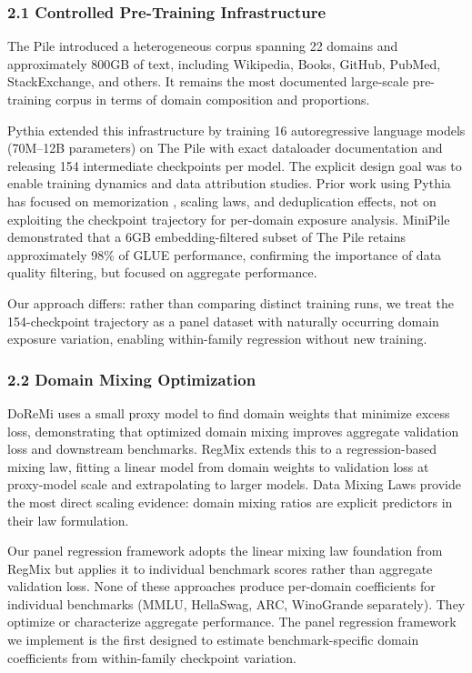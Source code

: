 
\subsubsection{2.1 Controlled Pre-Training Infrastructure}

The Pile \citep{Gao2020} introduced a heterogeneous corpus spanning 22 domains and approximately 800GB of text, including Wikipedia, Books, GitHub, PubMed, StackExchange, and others. It remains the most documented large-scale pre-training corpus in terms of domain composition and proportions.

Pythia \citep{Biderman2023} extended this infrastructure by training 16 autoregressive language models (70M--12B parameters) on The Pile with exact dataloader documentation and releasing 154 intermediate checkpoints per model. The explicit design goal was to enable training dynamics and data attribution studies. Prior work using Pythia has focused on memorization \citep{Biderman2023}, scaling laws, and deduplication effects, not on exploiting the checkpoint trajectory for per-domain exposure analysis. MiniPile \citep{Kaddour2023MiniPile} demonstrated that a 6GB embedding-filtered subset of The Pile retains approximately 98\% of GLUE performance, confirming the importance of data quality filtering, but focused on aggregate performance.

Our approach differs: rather than comparing distinct training runs, we treat the 154-checkpoint trajectory as a panel dataset with naturally occurring domain exposure variation, enabling within-family regression without new training.

\subsubsection{2.2 Domain Mixing Optimization}

DoReMi \citep{Xie2023} uses a small proxy model to find domain weights that minimize excess loss, demonstrating that optimized domain mixing improves aggregate validation loss and downstream benchmarks. RegMix \citep{Liu2024} extends this to a regression-based mixing law, fitting a linear model from domain weights to validation loss at proxy-model scale and extrapolating to larger models. Data Mixing Laws \citep{Ye2024} provide the most direct scaling evidence: domain mixing ratios are explicit predictors in their law formulation.

Our panel regression framework adopts the linear mixing law foundation from RegMix but applies it to individual benchmark scores rather than aggregate validation loss. None of these approaches produce per-domain coefficients for individual benchmarks (MMLU, HellaSwag, ARC, WinoGrande separately). They optimize or characterize aggregate performance. The panel regression framework we implement is the first designed to estimate benchmark-specific domain coefficients from within-family checkpoint variation.

